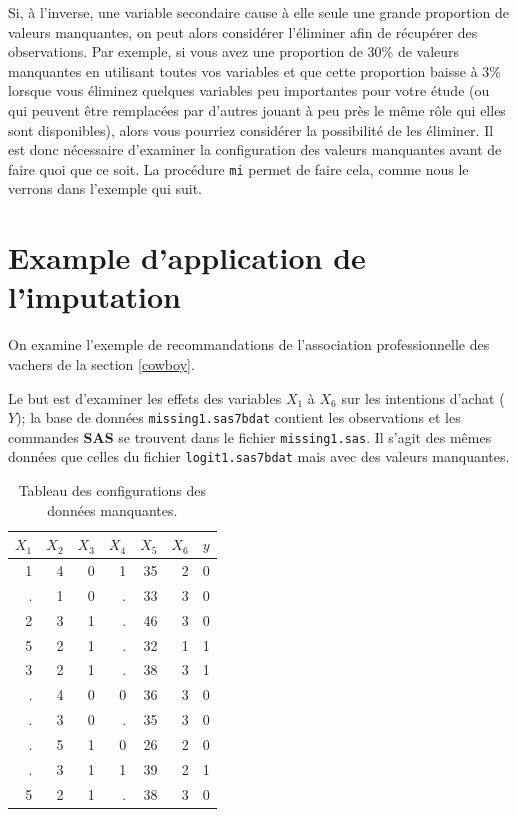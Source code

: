 \documentclass[
  11pt,
  letterpaper,
]{book}
\theoremstyle{definition}
\theoremstyle{definition}
\theoremstyle{definition}
\theoremstyle{definition}
\theoremstyle{remark}
\begin{document}
Si, à l'inverse, une variable secondaire cause à elle seule une grande proportion de valeurs manquantes, on peut alors considérer l'éliminer afin de récupérer des observations. Par exemple, si vous avez une proportion de 30\% de valeurs manquantes en utilisant toutes vos variables et que cette proportion baisse à 3\% lorsque vous éliminez quelques variables peu importantes pour votre étude (ou qui peuvent être remplacées par d'autres jouant à peu près le même rôle qui elles sont disponibles), alors vous pourriez considérer la possibilité de les éliminer. Il est donc nécessaire d'examiner la configuration des valeurs manquantes avant de faire quoi que ce soit. La procédure \texttt{mi} permet de faire cela, comme nous le verrons dans l'exemple qui suit.

\hypertarget{example-dapplication-de-limputation}{%
\section{Example d'application de l'imputation}\label{example-dapplication-de-limputation}}

On examine l'exemple de recommandations de l'association professionnelle des vachers de la section \ref{cowboy}.

Le but est d'examiner les effets des variables \(X_1\) à \(X_6\) sur les intentions d'achat (\(Y\)); la base de données \texttt{missing1.sas7bdat} contient les observations et les commandes \textbf{SAS} se trouvent dans le fichier \texttt{missing1.sas}. Il s'agit des mêmes données que celles du fichier \texttt{logit1.sas7bdat} mais avec des valeurs manquantes.

\begin{table}

\caption{\label{tab:missing1r}Tableau des configurations des données manquantes.}
\centering
\begin{tabular}[t]{rrrrrrr}
\toprule
$X_1$ & $X_2$ & $X_3$ & $X_4$ & $X_5$ & $X_6$ & $y$\\
\midrule
1 & 4 & 0 & 1 & 35 & 2 & 0\\
. & 1 & 0 & . & 33 & 3 & 0\\
2 & 3 & 1 & . & 46 & 3 & 0\\
5 & 2 & 1 & . & 32 & 1 & 1\\
3 & 2 & 1 & . & 38 & 3 & 1\\
\addlinespace
. & 4 & 0 & 0 & 36 & 3 & 0\\
. & 3 & 0 & . & 35 & 3 & 0\\
. & 5 & 1 & 0 & 26 & 2 & 0\\
. & 3 & 1 & 1 & 39 & 2 & 1\\
5 & 2 & 1 & . & 38 & 3 & 0\\
\bottomrule
\end{tabular}
\end{table}
\end{document}
